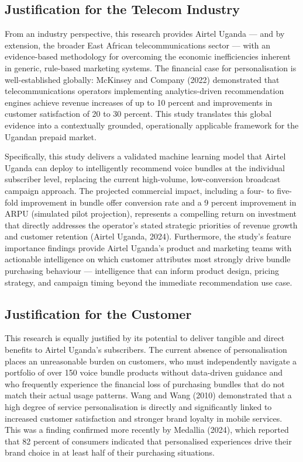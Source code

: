 \subsection{Justification for the Telecom Industry}

From an industry perspective, this research provides Airtel Uganda --- and by extension, the broader East African telecommunications sector --- with an evidence-based methodology for overcoming the economic inefficiencies inherent in generic, rule-based marketing systems. The financial case for personalisation is well-established globally: McKinsey and Company (2022) demonstrated that telecommunications operators implementing analytics-driven recommendation engines achieve revenue increases of up to 10 percent and improvements in customer satisfaction of 20 to 30 percent. This study translates this global evidence into a contextually grounded, operationally applicable framework for the Ugandan prepaid market.

Specifically, this study delivers a validated machine learning model that Airtel Uganda can deploy to intelligently recommend voice bundles at the individual subscriber level, replacing the current high-volume, low-conversion broadcast campaign approach. The projected commercial impact,  including a four- to five-fold improvement in bundle offer conversion rate and a 9 percent improvement in ARPU (simulated pilot projection), represents a compelling return on investment that directly addresses the operator's stated strategic priorities of revenue growth and customer retention (Airtel Uganda, 2024). Furthermore, the study's feature importance findings provide Airtel Uganda's product and marketing teams with actionable intelligence on which customer attributes most strongly drive bundle purchasing behaviour --- intelligence that can inform product design, pricing strategy, and campaign timing beyond the immediate recommendation use case.


\subsection{Justification for the Customer}

This research is equally justified by its potential to deliver tangible and direct benefits to Airtel Uganda's subscribers. The current absence of personalisation places an unreasonable burden on customers, who must independently navigate a portfolio of over 150 voice bundle products without data-driven guidance and who frequently experience the financial loss of purchasing bundles that do not match their actual usage patterns. Wang and Wang (2010) demonstrated that a high degree of service personalisation is directly and significantly linked to increased customer satisfaction and stronger brand loyalty in mobile services. This was a finding confirmed more recently by Medallia (2024), which reported that 82 percent of consumers indicated that personalised experiences drive their brand choice in at least half of their purchasing situations.

